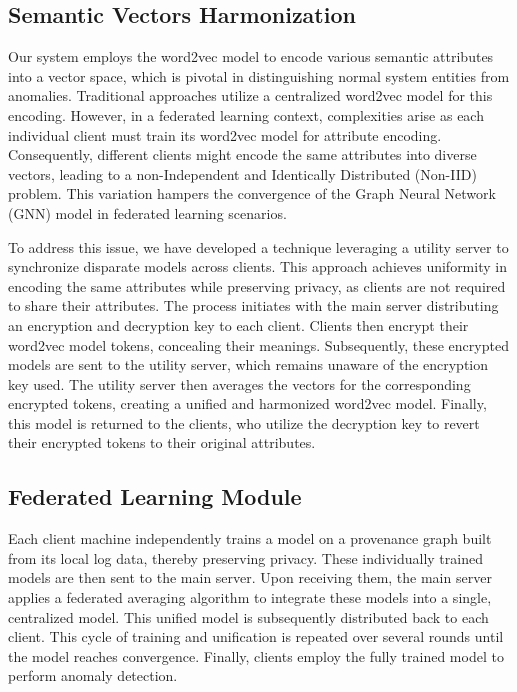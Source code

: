 \subsection{Semantic Vectors Harmonization}
Our system employs the word2vec model to encode various semantic attributes into a vector space, which is pivotal in distinguishing normal system entities from anomalies. Traditional approaches utilize a centralized word2vec model for this encoding. However, in a federated learning context, complexities arise as each individual client must train its word2vec model for attribute encoding. Consequently, different clients might encode the same attributes into diverse vectors, leading to a non-Independent and Identically Distributed (Non-IID) problem. This variation hampers the convergence of the Graph Neural Network (GNN) model in federated learning scenarios. 

To address this issue, we have developed a technique leveraging a utility server to synchronize disparate models across clients. This approach achieves uniformity in encoding the same attributes while preserving privacy, as clients are not required to share their attributes. The process initiates with the main server distributing an encryption and decryption key to each client. Clients then encrypt their word2vec model tokens, concealing their meanings. Subsequently, these encrypted models are sent to the utility server, which remains unaware of the encryption key used. The utility server then averages the vectors for the corresponding encrypted tokens, creating a unified and harmonized word2vec model. Finally, this model is returned to the clients, who utilize the decryption key to revert their encrypted tokens to their original attributes.

\subsection{Federated Learning Module}
Each client machine independently trains a \gnn model on a provenance graph built from its local log data, thereby preserving privacy. These individually trained models are then sent to the main server. Upon receiving them, the main server applies a federated averaging algorithm to integrate these models into a single, centralized model. This unified model is subsequently distributed back to each client. This cycle of training and unification is repeated over several rounds until the model reaches convergence. Finally, clients employ the fully trained model to perform anomaly detection.

